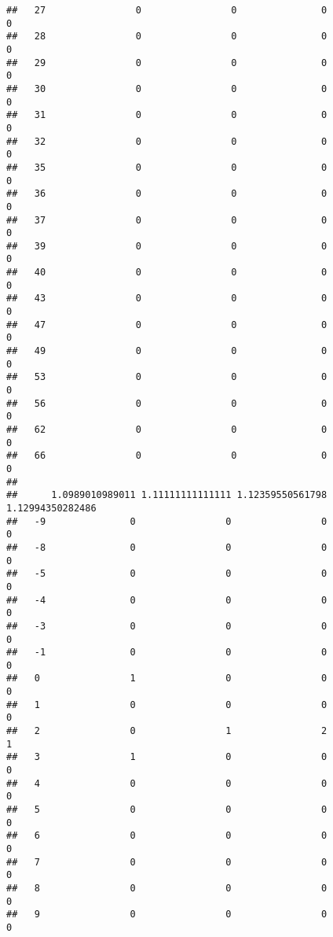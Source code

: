 \documentclass[]{article}
\begin{document}
\begin{verbatim}
##   27                0                0               0                0
##   28                0                0               0                0
##   29                0                0               0                0
##   30                0                0               0                0
##   31                0                0               0                0
##   32                0                0               0                0
##   35                0                0               0                0
##   36                0                0               0                0
##   37                0                0               0                0
##   39                0                0               0                0
##   40                0                0               0                0
##   43                0                0               0                0
##   47                0                0               0                0
##   49                0                0               0                0
##   53                0                0               0                0
##   56                0                0               0                0
##   62                0                0               0                0
##   66                0                0               0                0
##     
##      1.0989010989011 1.11111111111111 1.12359550561798 1.12994350282486
##   -9               0                0                0                0
##   -8               0                0                0                0
##   -5               0                0                0                0
##   -4               0                0                0                0
##   -3               0                0                0                0
##   -1               0                0                0                0
##   0                1                0                0                0
##   1                0                0                0                0
##   2                0                1                2                1
##   3                1                0                0                0
##   4                0                0                0                0
##   5                0                0                0                0
##   6                0                0                0                0
##   7                0                0                0                0
##   8                0                0                0                0
##   9                0                0                0                0

\end{verbatim}
\end{document}
